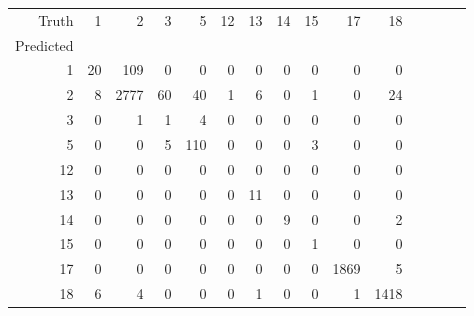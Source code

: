 \begin{table}[h]
\centering
\label{table:5}
\begin{tabular}{rrrrrrrrrrrrrrr}
\toprule
Truth & 1 & 2 & 3 & 5 & 12 & 13 & 14 & 15 & 17 & 18 \\
Predicted &  &  &  &  &  &  &  &  &  &  \\
\midrule
1 & 20 & 109 & 0 & 0 & 0 & 0 & 0 & 0 & 0 & 0 \\
2 & 8 & 2777 & 60 & 40 & 1 & 6 & 0 & 1 & 0 & 24 \\
3 & 0 & 1 & 1 & 4 & 0 & 0 & 0 & 0 & 0 & 0 \\
5 & 0 & 0 & 5 & 110 & 0 & 0 & 0 & 3 & 0 & 0 \\
12 & 0 & 0 & 0 & 0 & 0 & 0 & 0 & 0 & 0 & 0 \\
13 & 0 & 0 & 0 & 0 & 0 & 11 & 0 & 0 & 0 & 0 \\
14 & 0 & 0 & 0 & 0 & 0 & 0 & 9 & 0 & 0 & 2 \\
15 & 0 & 0 & 0 & 0 & 0 & 0 & 0 & 1 & 0 & 0 \\
17 & 0 & 0 & 0 & 0 & 0 & 0 & 0 & 0 & 1869 & 5 \\
18 & 6 & 4 & 0 & 0 & 0 & 1 & 0 & 0 & 1 & 1418 \\
\bottomrule
\end{tabular}
\end{table}
